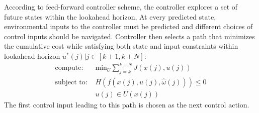According to feed-forward controller scheme, the controller explores a set of future states within the lookahead horizon, 
At every predicted state, environmental inputs to the controller must be predicted and different choices of control inputs should be navigated.
Controller then selects a path that minimizes the cumulative cost while satisfying both state and input constraints within lookahead horizon
$u^*(j)|j\in [k +1, k + N]$: 
\begin{equation} 
  \begin{split}
    \text{compute: } & \text{min}_U \sum_{j=k}^{k+N} J(x(j),u(j))  \\
    \text{subject to: } 
    & H(f(x(j),u(j),\hat{\omega}(j)))\leq 0 \\
    & u(j)\in U(x(j))
  \end{split}
\end{equation}
The first control input leading to this path is chosen as the next control action.

                                                                               
